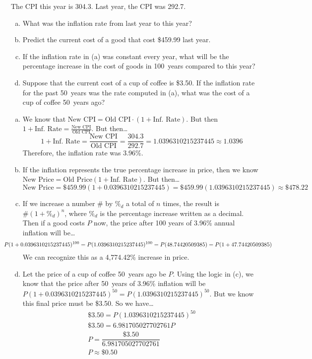 \documentclass[11pt,letterpaper]{article}
\begin{document}

 The CPI this year is 304.3. Last year, the CPI was 292.7. 
	\begin{enumerate}[(a)]
	\item What was the inflation rate from last year to this year?
	\item Predict the current cost of a good that cost \$459.99 last year. 
	\item If the inflation rate in (a) was constant every year, what will be the percentage increase in the cost of goods in 100~years compared to this year?
	\item Suppose that the current cost of a cup of coffee is \$3.50. If the inflation rate for the past 50~years was the rate computed in (a), what was the cost of a cup of coffee 50~years ago?
	\end{enumerate} \pspace

\sol 
\begin{enumerate}[(a)]
\item We know that $\text{New CPI}= \text{Old CPI} \cdot (1 + \text{Inf. Rate})$. But then $1 + \text{Inf. Rate}= \frac{\text{New CPI}}{\text{Old CPI}}$. But then\dots
	\[
	1 + \text{Inf. Rate}= \dfrac{\text{New CPI}}{\text{Old CPI}}= \dfrac{304.3}{292.7}= 1.0396310215237445 \approx 1.0396
	\]
Therefore, the inflation rate was 3.96\%. \pspace

\item If the inflation represents the true percentage increase in price, then we know $\text{New Price}= \text{Old Price} (1 + \text{Inf. Rate})$. But then\dots
	\[
	\text{New Price}= \$459.99 (1 + 0.0396310215237445)= \$459.99 (1.0396310215237445) \approx \$478.22
	\] \pspace

\item If we increase a number \# by $\%_d$ a total of $n$ times, the result is $\#(1 + \%_d)^n$, where $\%_d$ is the percentage increase written as a decimal. Then if a good costs $P$ now, the price after 100 years of 3.96\% annual inflation will be\dots
	\[
	\hspace{-1.2cm} P(1 + 0.0396310215237445)^{100}= P(1.0396310215237445)^{100}= P(48.74420509385)= P(1 + 47.74420509385)
	\]
We can recognize this as a 4,774.42\% increase in price. \pspace

\item Let the price of a cup of coffee 50~years ago be $P$. Using the logic in (c), we know that the price after 50~years of 3.96\% inflation will be $P(1 + 0.0396310215237445)^{50}= P(1.0396310215237445)^{50}$. But we know this final price must be \$3.50. So we have\dots
	\[
	\begin{gathered}
	\$3.50= P(1.0396310215237445)^{50} \\
	\$3.50= 6.981705027702761 P \\
	P= \dfrac{\$3.50}{6.981705027702761} \\
	P \approx \$0.50
	\end{gathered}
	\]
\end{enumerate}
\end{document}
